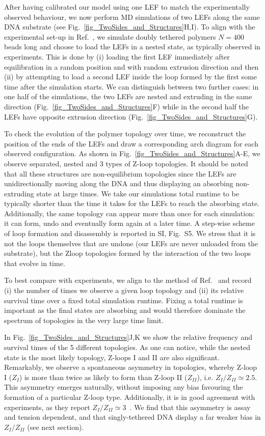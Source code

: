\documentclass[aps,prl,twocolumn,a4paper,10pt,notitlepage,footinbib,nobalancelastpage,superscriptaddress,showpacs,floatfix]{revtex4-1}%
\begin{document}
After having calibrated our model using one LEF to match the experimentally observed behaviour, we now perform MD simulations of two LEFs along the same DNA substrate (see Fig.~\ref{fig_TwoSides_and_Structures}H,I). To align with the experimental set-up in Ref.~\cite{Kim2020}, we simulate doubly tethered polymers $N=400$ beads long and choose to load the LEFs in a nested state, as typically observed in experiments.  
This is done by (i) loading the first LEF immediately after equilibration in a random position and with random extrusion direction and then (ii) by attempting to load a second LEF inside the loop formed by the first some time after the simulation starts. We can distinguish between two further cases: in one half of the simulations, the two LEFs are nested and extruding in the same direction (Fig.~\ref{fig_TwoSides_and_Structures}F) while in the second half the LEFs have opposite extrusion direction (Fig.~\ref{fig_TwoSides_and_Structures}G).


To check the evolution of the polymer topology over time, we reconstruct the position of the ends of the LEFs and draw a corresponding arch diagram for each observed configuration. As shown in Fig.~\ref{fig_TwoSides_and_Structures}A-E, we observe separated, nested and 3 types of Z-loop topologies. It should be noted that all these structures are non-equilibrium topologies since the LEFs are unidirectionally moving along the DNA and thus displaying an absorbing non-extruding state at large times. We take our simulations total runtime to be typically shorter than the time it takes for the LEFs to reach the absorbing state. Additionally, the same topology can appear more than once for each simulation: it can form, undo and eventually form again at a later time. A step-wise scheme of loop formation and disassembly is reported in SI, Fig.~S5. We stress that it is not the loops themselves that are undone (our LEFs are never unloaded from the substrate), but the Zloop topologies formed by the interaction of the two loops that evolve in time.

To best compare with experiments, we align to the method of Ref.~\cite{Kim2020} and record (i) the number of times we observe a given loop topology and (ii) its relative survival time over a fixed total simulation runtime. Fixing a total runtime is important as the final states are absorbing and would therefore dominate the spectrum of topologies in the very large time limit.

In Fig.~\ref{fig_TwoSides_and_Structures}J,K we show the relative frequency and survival times of the 5 different topologies. 
As one can notice, while the nested state is the most likely topology, Z-loops I and II are also significant. Remarkably, we observe a spontaneous asymmetry in topologies, whereby Z-loop I ($Z_I$) is more than twice as likely to form than Z-loop II ($Z_{II}$), i.e. $Z_I/Z_{II}\simeq 2.5$. This asymmetry emerges naturally, without imposing any bias favouring the formation of a particular Z-loop type.
Additionally, it is in good agreement with experiments, as they report $Z_I/Z_{II} \simeq 3$~\cite{Kim2020}. We find that this asymmetry is assay and tension dependent, and that singly-tethered DNA display a far weaker bias in $Z_I/Z_{II}$ (see next section). 
\end{document}
